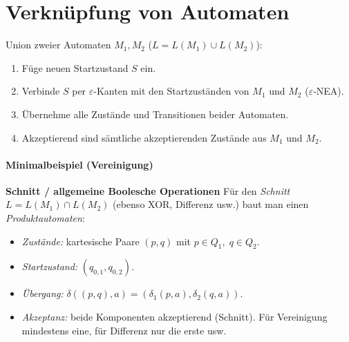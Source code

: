 \section{Verknüpfung von Automaten}
Union zweier Automaten $M_1,M_2$ ($L=L(M_1)\cup L(M_2)$):
\begin{enumerate}
  \item Füge neuen Startzustand $S$ ein.
  \item Verbinde $S$ per $\varepsilon$-Kanten mit den Startzuständen von $M_1$ und $M_2$ ($\varepsilon$‑NEA).
  \item Übernehme alle Zustände und Transitionen beider Automaten.
  \item Akzeptierend sind sämtliche akzeptierenden Zustände aus $M_1$ und $M_2$.
\end{enumerate}

\paragraph{Minimalbeispiel (Vereinigung)}\leavevmode
\begin{center}
\end{center}

\noindent\textbf{Schnitt / allgemeine Boolesche Operationen}  
Für den \emph{Schnitt} $L=L(M_1)\cap L(M_2)$ (ebenso XOR, Differenz usw.) baut man einen
\emph{Produktautomaten}:
\begin{itemize}
  \item \textit{Zustände:} kartesische Paare $(p,q)$ mit $p\in Q_1,\;q\in Q_2$.
  \item \textit{Startzustand:} $(q_{0,1},q_{0,2})$.
  \item \textit{Übergang:} $\delta((p,q),a)=(\delta_1(p,a),\delta_2(q,a))$.
  \item \textit{Akzeptanz:} beide Komponenten akzeptierend (Schnitt). Für Vereinigung mindestens eine, für Differenz nur die erste usw.
\end{itemize}

